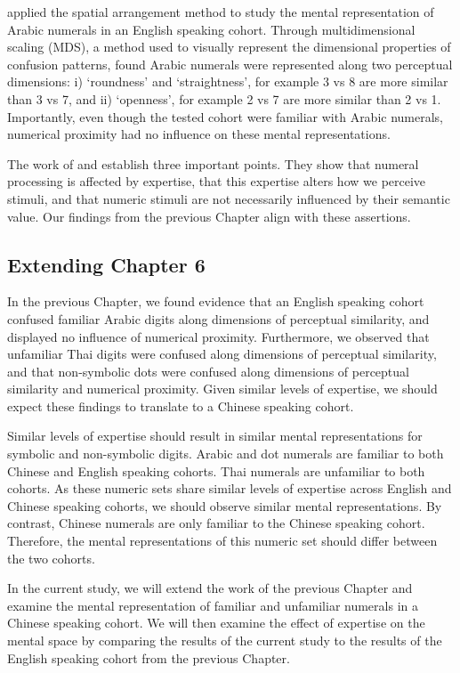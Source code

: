 applied the spatial arrangement method to study the mental representation of Arabic numerals in an English speaking cohort. Through multidimensional scaling (MDS), a method used to visually represent the dimensional properties of confusion patterns,  found Arabic numerals were represented along two perceptual dimensions: i) `roundness' and `straightness', for example 3 vs 8 are more similar than 3 vs 7,  and ii) `openness', for example 2 vs 7 are more similar than 2 vs 1. Importantly, even though the tested cohort were familiar with Arabic numerals, numerical proximity had no influence on these mental representations. 

The work of  and  establish three important points. They show that numeral processing is affected by expertise, that this expertise alters how we perceive stimuli, and that numeric stimuli are not necessarily influenced by their semantic value. Our findings from the previous Chapter align with these assertions. 

\subsection{Extending Chapter 6}
In the previous Chapter, we found evidence that an English speaking cohort confused familiar Arabic digits along dimensions of perceptual similarity, and displayed no influence of numerical proximity. Furthermore, we observed that unfamiliar Thai digits were confused along dimensions of perceptual similarity, and that non-symbolic dots were confused along dimensions of perceptual similarity and numerical proximity. Given similar levels of expertise, we should expect these findings to translate to a Chinese speaking cohort.

Similar levels of expertise should result in similar mental representations for symbolic and non-symbolic digits. Arabic and dot numerals are familiar to both Chinese and English speaking cohorts. Thai numerals are unfamiliar to both cohorts. As these numeric sets share similar levels of expertise across English and Chinese speaking cohorts, we should observe similar mental representations. By contrast, Chinese numerals are only familiar to the Chinese speaking cohort. Therefore, the mental representations of this numeric set should differ between the two cohorts.

In the current study, we will extend the work of the previous Chapter and examine the mental representation of familiar and unfamiliar numerals in a Chinese speaking cohort. We will then examine the effect of expertise on the mental space by comparing the results of the current study to the results of the English speaking cohort from the previous Chapter.

